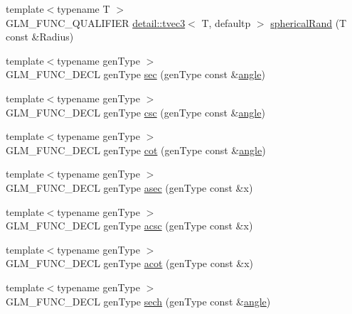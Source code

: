 \begin{DoxyCompactItemize}
\item 
{\footnotesize template$<$typename T $>$ }\\G\+L\+M\+\_\+\+F\+U\+N\+C\+\_\+\+Q\+U\+A\+L\+I\+F\+I\+ER \hyperlink{structglm_1_1detail_1_1tvec3}{detail\+::tvec3}$<$ T, defaultp $>$ \hyperlink{group__gtc__random_ga8a9eee1fcb08690881ead242fe4259dc}{spherical\+Rand} (T const \&Radius)
\item 
{\footnotesize template$<$typename gen\+Type $>$ }\\G\+L\+M\+\_\+\+F\+U\+N\+C\+\_\+\+D\+E\+CL gen\+Type \hyperlink{group__gtc__reciprocal_gabb6829a472da1cc94d88afa6396bed1f}{sec} (gen\+Type const \&\hyperlink{group__gtc__quaternion_ga23a3fc7ada5bbb665ff84c92c6e0542c}{angle})
\item 
{\footnotesize template$<$typename gen\+Type $>$ }\\G\+L\+M\+\_\+\+F\+U\+N\+C\+\_\+\+D\+E\+CL gen\+Type \hyperlink{group__gtc__reciprocal_ga5df75de99f63e854087a06f538907b2c}{csc} (gen\+Type const \&\hyperlink{group__gtc__quaternion_ga23a3fc7ada5bbb665ff84c92c6e0542c}{angle})
\item 
{\footnotesize template$<$typename gen\+Type $>$ }\\G\+L\+M\+\_\+\+F\+U\+N\+C\+\_\+\+D\+E\+CL gen\+Type \hyperlink{group__gtc__reciprocal_ga2f49e28c2634ae1a212e2fc38c42ad42}{cot} (gen\+Type const \&\hyperlink{group__gtc__quaternion_ga23a3fc7ada5bbb665ff84c92c6e0542c}{angle})
\item 
{\footnotesize template$<$typename gen\+Type $>$ }\\G\+L\+M\+\_\+\+F\+U\+N\+C\+\_\+\+D\+E\+CL gen\+Type \hyperlink{group__gtc__reciprocal_gac9761980e09149002a466ca131a4bcac}{asec} (gen\+Type const \&x)
\item 
{\footnotesize template$<$typename gen\+Type $>$ }\\G\+L\+M\+\_\+\+F\+U\+N\+C\+\_\+\+D\+E\+CL gen\+Type \hyperlink{group__gtc__reciprocal_ga135e8f6b36bb85b5f7d8067e6b890e4d}{acsc} (gen\+Type const \&x)
\item 
{\footnotesize template$<$typename gen\+Type $>$ }\\G\+L\+M\+\_\+\+F\+U\+N\+C\+\_\+\+D\+E\+CL gen\+Type \hyperlink{group__gtc__reciprocal_ga97d029f989f849b62915b068c264246b}{acot} (gen\+Type const \&x)
\item 
{\footnotesize template$<$typename gen\+Type $>$ }\\G\+L\+M\+\_\+\+F\+U\+N\+C\+\_\+\+D\+E\+CL gen\+Type \hyperlink{group__gtc__reciprocal_gaaa698b992c63f454a3a1a1baa2773a3c}{sech} (gen\+Type const \&\hyperlink{group__gtc__quaternion_ga23a3fc7ada5bbb665ff84c92c6e0542c}{angle})

\end{DoxyCompactItemize}
